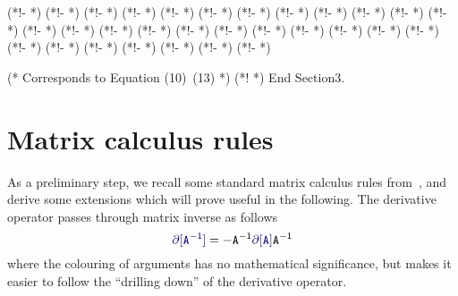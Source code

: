 \documentclass[runningheads]{llncs}
\def\eqlabel#1{\label{eq:#1}}
\def\tr{^\top}
\def\xcomment#1{\textcolor[gray]{.2}{\text{\em---#1}}}
\def\comment#1{\kern-1cm\xcomment{#1}}
\def\vec{\operatorname{vec}}
\def\hadamard{\odot}
\def\m#1{\ensuremath{\mathtt{#1}}}
\def\v#1{\ensuremath{\mathbf{#1}}}
\def\mU{\m U}
\def\mV{\m V}
\def\mW{\m W}
\def\mM{\m M}
\def\twiddle#1{{\tilde{#1}}}
\def\tW{\twiddle\mW}
\begin{document}
\begin{coq_example}
(*!- \coqadd{\*:}{ } *)
(*!- \coqadd{:\*}{ } *)
(*!-  *)
(*!-  *)
(*!-  *)
(*!-  *)
(*!-  *)
(*!- \coqadd{\.\*}{\hadamard} *)
(*!- \coqadd{\bvec\b}{\vec} *)
(*!-  *)
(*!- \coqadd{\\\\d}{\partial} *)
(*!-  *)
(*!-  *)
(*!-  *)
(*!- \coqadd{\^T\b}{\tr} *)
(*!- \coqadd{\^\+}{^\dagger} *)
(*!-  *)
(*!- \coqadd{\^-\s*(\w+)}{^{-\1}} *)
(*!- \coqadd{\\m\b}{\v m} *)
(*!-  *)
(*!- \coqadd{~W\b}{\tW} *)
(*!-  *)
(*!-  *)
(*!-  *)
(*!-  *)
(*!-  *)
(*!- \coqadd{\bW\b}{\mW} *)
(*!- \coqadd{\bM\b}{\mM} *)
(*!- \coqadd{\bU\b}{\mU} *)
(*!- \coqadd{\bV\b}{\mV} *)

(* Corresponds to Equation (10)~(13) *)
(*! \def\vecdot{ *)
(*! \begin{align} *)
Lemma vec_dot V : vec (W .* (M - U *m V^T)) = ~W *m \m - ~W *m ~U *m vec V^T.
Proof.
  set goal := RHS.
  rewrite vec_elemprod.
  (*! \coqvar{from} &= \coqvar{lhs} *)
  (*!n & \comment{ Define $\tW := \operatorname{diag}(\vec\mW)$ } *)
  rewrite !raddfB /=.
  (*! \\ &= \coqvar{lhs} *)
  (*!n & \xcomment{ Define $\v m := \vec\mM$} \eqlabel{resvec1} *)
  by rewrite vec_kron !mulmxA.
  (*! \\ &= \coqvar{to} *)
  (*!n & \comment{ Define $\twiddle\mU := \kron{\Id n}{\mU}$} \eqlabel{\coqvar{name}} *)
Qed.
(*! \end{align} *)
(*! } *)
End Section3.
\end{coq_example}

\section{Matrix calculus rules}
As a preliminary step, we recall some standard matrix calculus rules from~\cite{minka00}, and derive some extensions which will prove useful in the following.   The derivative operator passes through matrix inverse as follows
\begin{equation}
\diff[\inv \mA] = -\inv \mA \diff[\mA] \inv \mA
\end{equation}
where the colouring of arguments has no mathematical significance, but makes it easier to follow the ``drilling down'' of the derivative operator.  
\end{document}
